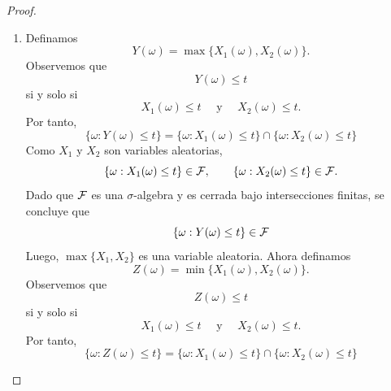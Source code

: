 \documentclass[12pt,a4paper]{article}
\begin{document}
    \begin{proof}
        \begin{enumerate}
            \item[(a)] Definamos
            \begin{equation*}
                Y(\omega)=\max\{X_{1}(\omega),X_{2}(\omega)\}.
            \end{equation*}
            Observemos que
            \begin{equation*}
                Y(\omega)\leq t
            \end{equation*}
            si y solo si
            \begin{equation*}
                X_{1}(\omega)\leq t\quad\text{ y }\quad X_{2}(\omega)\leq t.
            \end{equation*}
            Por tanto,
            \begin{equation*}
                \{\omega: Y(\omega)\leq t\}=\{\omega:X_{1}(\omega)\leq t\}\cap\{\omega:X_{2}(\omega)\leq t\}
            \end{equation*}
            Como $X_{1}$ y $X_{2}$ son variables aleatorias,
            \begin{equation*}
                \{\omega:X_{1}(\omega)\leq t\}\in\mathcal{F},\qquad \{\omega:X_{2}(\omega)\leq t\}\in\mathcal{F}.
            \end{equation*}
            Dado que $\mathcal{F}$ es una $\sigma$-algebra y es cerrada bajo intersecciones finitas, se concluye que
            \begin{equation*}
                \{\omega: Y(\omega)\leq t\}\in\mathcal{F}
            \end{equation*}
            Luego, $\max\{X_{1},X_{2}\}$ es una variable aleatoria. Ahora definamos
            \begin{equation*}
                Z(\omega)=\min\{X_{1}(\omega),X_{2}(\omega)\}.
            \end{equation*}
            Observemos que
            \begin{equation*}
                Z(\omega)\leq t
            \end{equation*}
            si y solo si
            \begin{equation*}
                X_{1}(\omega)\leq t\quad\text{ y }\quad X_{2}(\omega)\leq t.
            \end{equation*}
            Por tanto,
            \begin{equation*}
                \{\omega: Z(\omega)\leq t\}=\{\omega:X_{1}(\omega)\leq t\}\cap\{\omega:X_{2}(\omega)\leq t\}

\end{equation*}
\end{enumerate}
\end{proof}
\end{document}
